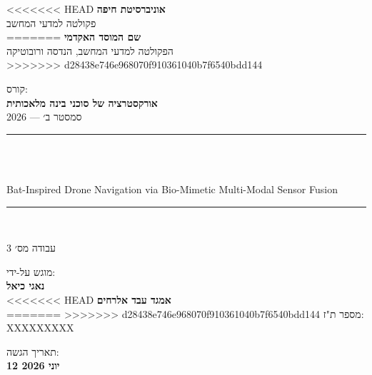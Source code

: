 \begin{titlepage}
    \centering
    \vspace*{1.5cm}

<<<<<<< HEAD
    {\large\textbf{אוניברסיטת חיפה}}\\
    \vspace{0.3em}
    {\normalsize פקולטה למדעי המחשב}\\
=======
    {\large\textbf{שם המוסד האקדמי}}\\
    \vspace{0.3em}
    {\normalsize הפקולטה למדעי המחשב, הנדסה ורובוטיקה}\\
>>>>>>> d28438e746e968070f910361040b7f6540bdd144
    \vspace{1.5cm}

    {\normalsize קורס:}\\
    \vspace{0.2em}
    {\large\textbf{אורקסטרציה של סוכני בינה מלאכותית}}\\
    \vspace{0.2em}
    {\normalsize סמסטר ב׳ --- 2026}\\
    \vspace{1.5cm}

    \rule{\linewidth}{1pt}\\
    \vspace{0.5cm}

    {\LARGE\bfseries {}}\\
    \vspace{0.4em}
    {\large\foreignlanguage{english}{Bat-Inspired Drone Navigation via Bio-Mimetic Multi-Modal Sensor Fusion}}\\
    \vspace{0.3em}

    \rule{\linewidth}{1pt}\\
    \vspace{1.5cm}

    {\large עבודה מס׳ 3}\\
    \vspace{2cm}

    {\normalsize מוגש על-ידי:}\\
    \vspace{0.5em}
    {\large\textbf{נאגי כיאל}}\\
    \vspace{0.2em}
<<<<<<< HEAD
    {\large\textbf{אמגד עבד אלרחים}}\\
    \vspace{0.2em}
=======
>>>>>>> d28438e746e968070f910361040b7f6540bdd144
    {\normalsize מספר ת"ז: XXXXXXXXX}\\
    \vspace{1cm}

    \vfill
    {\normalsize תאריך הגשה:}\\
    \vspace{0.2em}
    {\large\textbf{12 יוני 2026}}\\
    \vspace{1cm}
\end{titlepage}
